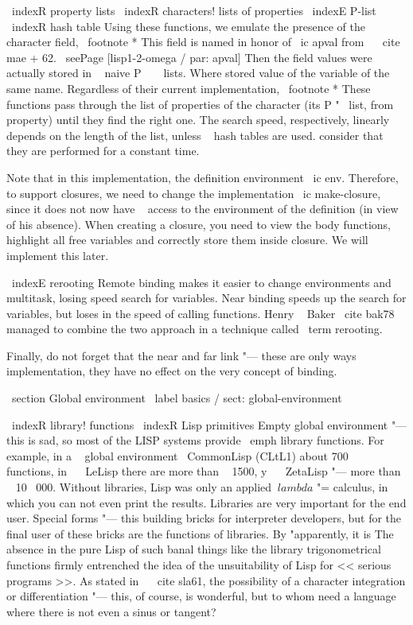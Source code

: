 {{\ indexR {property lists}
\ indexR {characters! lists of properties}
\ indexE {P-list}
\ indexR {hash table}
Using these functions, we emulate the presence of the ~ character field, \ footnote * {This field
is named in honor of \ ic {apval} from ~ \ cite {mae + 62}. \ seePage [lisp1-2-omega / par: apval]
Then the field values ​​were actually stored in ~ naive P ~ ~ lists.} Where stored
value of the variable of the same name. Regardless of their current implementation, %
\ footnote * {These functions pass through the list of properties of the character (its P "~ list,
from ~ property) until they find the right one. The search speed, respectively,
linearly depends on the length of the list, unless ~ hash tables are used.}
consider that they are performed for a constant time.

Note that in this implementation, the definition environment
\ ic {env}. Therefore, to support closures, we need to change the implementation
\ ic {make-closure}, since it does not now have ~ access to the environment of the definition
(in view of his absence). When creating a closure, you need to view the body
functions, highlight all free variables and correctly store them inside
closure. We will implement this later.

\ indexE {rerooting}
Remote binding makes it easier to change environments and multitask, losing speed
search for variables. Near binding speeds up the search for variables, but loses
in the speed of calling functions. Henry ~ Baker \ cite {bak78} managed to combine the two
approach in a technique called \ term {rerooting}.

Finally, do not forget that the near and far link "--- these are only ways
implementation, they have no effect on the very concept of binding.


\ section {Global environment} \ label {basics / sect: global-environment}

\ indexR {library! functions}
\ indexR {Lisp primitives}
Empty global environment "--- this is sad, so most of the LISP systems
provide \ emph {library} functions. For example, in a ~ global environment
{ \ CommonLisp } (CLtL1) about 700 ~ functions, in ~ { \ LeLisp } there are more than ~ 1500,
y ~ { \ ZetaLisp } "--- more than ~ 10 \, 000. Without libraries, Lisp was only an applied
$ \ lambda $ "= calculus, in which you can not even print the results.
Libraries are very important for the end user. Special forms "--- this
building bricks for interpreter developers, but for the final
user of these bricks are the functions of libraries. By "apparently, it is
The absence in the pure Lisp of such banal things like the library
trigonometrical functions firmly entrenched the idea of ​​the unsuitability of Lisp for
<< serious programs >>. As stated in ~ \ cite {sla61}, the possibility of a character
integration or differentiation "--- this, of course, is wonderful, but to whom
need a language where there is not even a sinus or tangent?

}}
